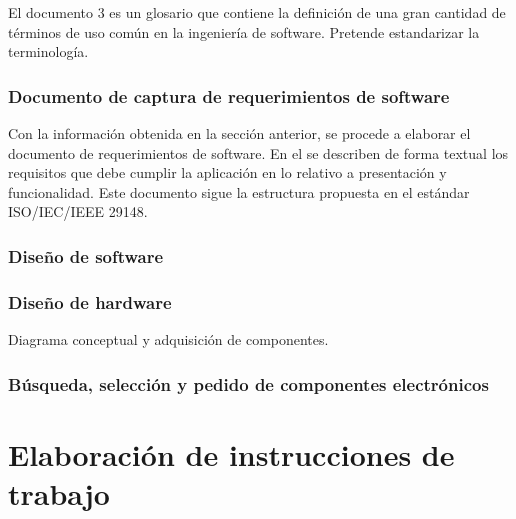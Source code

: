 \documentclass[paper=letter,oneside,fontsize=12pt, parskip=full]{article}
\begin{document}
	El documento 3 es un glosario que contiene la definición de una gran cantidad de términos de uso común en la ingeniería de software. Pretende estandarizar la terminología.	

	\subsubsection{Documento de captura de requerimientos de software}
	
	Con la información obtenida en la sección anterior, se procede a elaborar el documento de requerimientos de software. En el se describen de forma textual los requisitos que debe cumplir la aplicación en lo relativo a presentación y funcionalidad. Este documento sigue la estructura propuesta en el estándar ISO/IEC/IEEE 29148.
	
	\subsubsection{Diseño de software}
	
	
	
	\subsubsection{Diseño de hardware}	
	
	Diagrama conceptual y adquisición de componentes.
	
	\subsubsection{Búsqueda, selección y pedido de componentes electrónicos}
	
	\section{Elaboración de instrucciones de trabajo}

	
\end{document}
